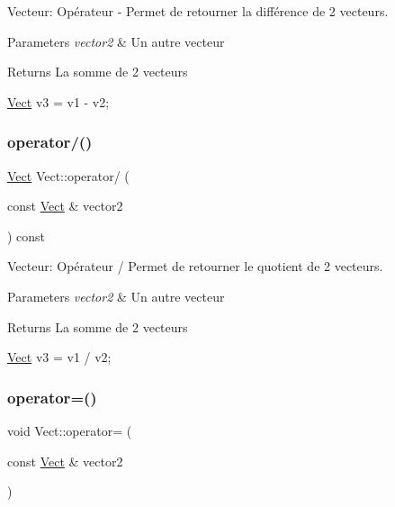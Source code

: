 Vecteur\+: Opérateur -\/ Permet de retourner la différence de 2 vecteurs. 


\begin{DoxyParams}{Parameters}
{\em vector2} & Un autre vecteur \\
\hline
\end{DoxyParams}
\begin{DoxyReturn}{Returns}
La somme de 2 vecteurs 
\begin{DoxyCode}
\hyperlink{classVect}{Vect} v3 = v1 - v2;
\end{DoxyCode}
 
\end{DoxyReturn}
\mbox{\label{classVect_a08e7e684ad85024233a59aff86eb5c83}} 
\subsubsection{\texorpdfstring{operator/()}{operator/()}}
{\footnotesize\ttfamily \hyperlink{classVect}{Vect} Vect\+::operator/ (\begin{DoxyParamCaption}\item[{const \hyperlink{classVect}{Vect} \&}]{vector2 }\end{DoxyParamCaption}) const}



Vecteur\+: Opérateur / Permet de retourner le quotient de 2 vecteurs. 


\begin{DoxyParams}{Parameters}
{\em vector2} & Un autre vecteur \\
\hline
\end{DoxyParams}
\begin{DoxyReturn}{Returns}
La somme de 2 vecteurs 
\begin{DoxyCode}
\hyperlink{classVect}{Vect} v3 = v1 / v2;
\end{DoxyCode}
 
\end{DoxyReturn}
\mbox{\label{classVect_a3218ca29a8bf2bc95e99600b2cf385f5}} 
\subsubsection{\texorpdfstring{operator=()}{operator=()}}
{\footnotesize\ttfamily void Vect\+::operator= (\begin{DoxyParamCaption}\item[{const \hyperlink{classVect}{Vect} \&}]{vector2 }\end{DoxyParamCaption})}



